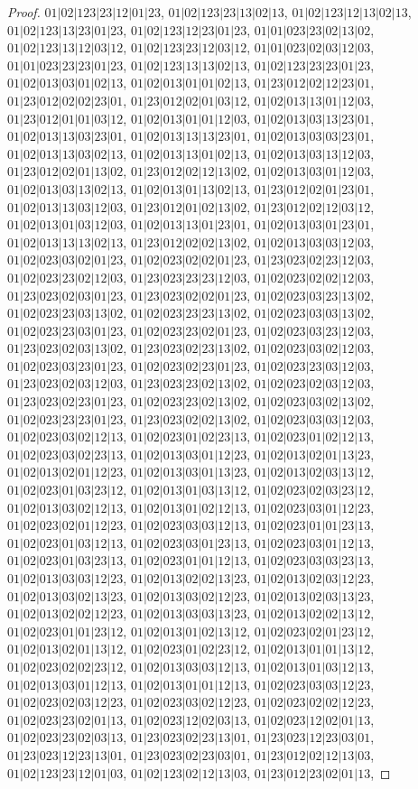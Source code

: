 \documentclass[12pt]{article}
\theoremstyle{plain}
\theoremstyle{definition}
\theoremstyle{remark}
\begin{document}
\begin{proof}
$01|02|123|23|12|01|23$, $01|02|123|23|13|02|13$, $01|02|123|12|13|02|13$, $01|02|123|13|23|01|23$, $01|02|123|12|23|01|23$, $01|01|023|23|02|13|02$, $01|02|123|13|12|03|12$, $01|02|123|23|12|03|12$, $01|01|023|02|03|12|03$, $01|01|023|23|23|01|23$, $01|02|123|13|13|02|13$, $01|02|123|23|23|01|23$, $01|02|013|03|01|02|13$, $01|02|013|01|01|02|13$, $01|23|012|02|12|23|01$, $01|23|012|02|02|23|01$, $01|23|012|02|01|03|12$, $01|02|013|13|01|12|03$, $01|23|012|01|01|03|12$, $01|02|013|01|01|12|03$, $01|02|013|03|13|23|01$, $01|02|013|13|03|23|01$, $01|02|013|13|13|23|01$, $01|02|013|03|03|23|01$, $01|02|013|13|03|02|13$, $01|02|013|13|01|02|13$, $01|02|013|03|13|12|03$, $01|23|012|02|01|13|02$, $01|23|012|02|12|13|02$, $01|02|013|03|01|12|03$, $01|02|013|03|13|02|13$, $01|02|013|01|13|02|13$, $01|23|012|02|01|23|01$, $01|02|013|13|03|12|03$, $01|23|012|01|02|13|02$, $01|23|012|02|12|03|12$, $01|02|013|01|03|12|03$, $01|02|013|13|01|23|01$, $01|02|013|03|01|23|01$, $01|02|013|13|13|02|13$, $01|23|012|02|02|13|02$, $01|02|013|03|03|12|03$, $01|02|023|03|02|01|23$, $01|02|023|02|02|01|23$, $01|23|023|02|23|12|03$, $01|02|023|23|02|12|03$, $01|23|023|23|23|12|03$, $01|02|023|02|02|12|03$, $01|23|023|02|03|01|23$, $01|23|023|02|02|01|23$, $01|02|023|03|23|13|02$, $01|02|023|23|03|13|02$, $01|02|023|23|23|13|02$, $01|02|023|03|03|13|02$, $01|02|023|23|03|01|23$, $01|02|023|23|02|01|23$, $01|02|023|03|23|12|03$, $01|23|023|02|03|13|02$, $01|23|023|02|23|13|02$, $01|02|023|03|02|12|03$, $01|02|023|03|23|01|23$, $01|02|023|02|23|01|23$, $01|02|023|23|03|12|03$, $01|23|023|02|03|12|03$, $01|23|023|23|02|13|02$, $01|02|023|02|03|12|03$, $01|23|023|02|23|01|23$, $01|02|023|23|02|13|02$, $01|02|023|03|02|13|02$, $01|02|023|23|23|01|23$, $01|23|023|02|02|13|02$, $01|02|023|03|03|12|03$, $01|02|023|03|02|12|13$, $01|02|023|01|02|23|13$, $01|02|023|01|02|12|13$, $01|02|023|03|02|23|13$, $01|02|013|03|01|12|23$, $01|02|013|02|01|13|23$, $01|02|013|02|01|12|23$, $01|02|013|03|01|13|23$, $01|02|013|02|03|13|12$, $01|02|023|01|03|23|12$, $01|02|013|01|03|13|12$, $01|02|023|02|03|23|12$, $01|02|013|03|02|12|13$, $01|02|013|01|02|12|13$, $01|02|023|03|01|12|23$, $01|02|023|02|01|12|23$, $01|02|023|03|03|12|13$, $01|02|023|01|01|23|13$, $01|02|023|01|03|12|13$, $01|02|023|03|01|23|13$, $01|02|023|03|01|12|13$, $01|02|023|01|03|23|13$, $01|02|023|01|01|12|13$, $01|02|023|03|03|23|13$, $01|02|013|03|03|12|23$, $01|02|013|02|02|13|23$, $01|02|013|02|03|12|23$, $01|02|013|03|02|13|23$, $01|02|013|03|02|12|23$, $01|02|013|02|03|13|23$, $01|02|013|02|02|12|23$, $01|02|013|03|03|13|23$, $01|02|013|02|02|13|12$, $01|02|023|01|01|23|12$, $01|02|013|01|02|13|12$, $01|02|023|02|01|23|12$, $01|02|013|02|01|13|12$, $01|02|023|01|02|23|12$, $01|02|013|01|01|13|12$, $01|02|023|02|02|23|12$, $01|02|013|03|03|12|13$, $01|02|013|01|03|12|13$, $01|02|013|03|01|12|13$, $01|02|013|01|01|12|13$, $01|02|023|03|03|12|23$, $01|02|023|02|03|12|23$, $01|02|023|03|02|12|23$, $01|02|023|02|02|12|23$, $01|02|023|23|02|01|13$, $01|02|023|12|02|03|13$, $01|02|023|12|02|01|13$, $01|02|023|23|02|03|13$, $01|23|023|02|23|13|01$, $01|23|023|12|23|03|01$, $01|23|023|12|23|13|01$, $01|23|023|02|23|03|01$, $01|23|012|02|12|13|03$, $01|02|123|23|12|01|03$, $01|02|123|02|12|13|03$, $01|23|012|23|02|01|13$, 
\end{proof}
\end{document}
